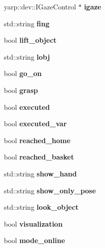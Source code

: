 \begin{DoxyCompactItemize}
\item 
yarp\+::dev\+::\+I\+Gaze\+Control $\ast$ {\bfseries igaze}\label{classGraspingModule_a70a410aead666d7198eb183ba05472a5}

\item 
std\+::string {\bfseries fing}\label{classGraspingModule_ad33afeaa6a6b67f3f49ccb4ee771e6cb}

\item 
bool {\bfseries lift\+\_\+object}\label{classGraspingModule_ae7f23202919c7dbd742230a2cc005043}

\item 
std\+::string {\bfseries lobj}\label{classGraspingModule_af871b2ab1e5110408893eef5ac711984}

\item 
bool {\bfseries go\+\_\+on}\label{classGraspingModule_aa1da1c0d76de383f74360bc9c9125e77}

\item 
bool {\bfseries grasp}\label{classGraspingModule_ae56f0d9a9eed5d68051da744dac15a41}

\item 
bool {\bfseries executed}\label{classGraspingModule_a499af38a89686312a34117c0218fc6cb}

\item 
bool {\bfseries executed\+\_\+var}\label{classGraspingModule_abdcf071d6ce460a83c56ef1ba90f8b1f}

\item 
bool {\bfseries reached\+\_\+home}\label{classGraspingModule_af46e9f6a4a79bb39db0f975803d739b3}

\item 
bool {\bfseries reached\+\_\+basket}\label{classGraspingModule_a295ffc6e5c40dea6d6e222f3f487ec67}

\item 
std\+::string {\bfseries show\+\_\+hand}\label{classGraspingModule_af05d3fc99e87d5ab513bb9fe91f0bcea}

\item 
std\+::string {\bfseries show\+\_\+only\+\_\+pose}\label{classGraspingModule_ae9a9a1e59ba2298fac3c4f34996ec25e}

\item 
std\+::string {\bfseries look\+\_\+object}\label{classGraspingModule_ac74a028982f21c24a3405deb41e70f9f}

\item 
bool {\bfseries visualization}\label{classGraspingModule_afb42ea3b2951d1e8abe7f391675d8f73}

\item 
bool {\bfseries mode\+\_\+online}\label{classGraspingModule_afa54033aed276e29223d9a88a6f7f145}


\end{DoxyCompactItemize}
